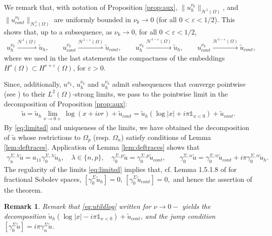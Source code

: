 \documentclass[report]{elsarticle}
\newtheorem{remark}[theorem]{Remark}
\numberwithin{theorem}{section}
\newcommand{\re}{\varepsilon}
\begin{document}
We remark that, with notation of Proposition \ref{prop:aux}, $\|u^{\nu_k}_h\|_{\mathcal{H}^1(\Omega)}$, and $\|u^{\nu_k}_{cont}\|_{\mathcal{H}^1_{\re}(\Omega)}$ are uniformly bounded in $\nu_k\rightarrow 0$ (for all $0<\re<1/2$). This shows that, up to a subsequence, as $\nu_k\rightarrow 0$, for all $0<\re<1/2$, 
\begin{align}
	\label{eq:limitsd}
	u^{\nu_k}_h\overset{\mathcal{H}^{1}(\Omega)}{\rightharpoonup} \widetilde{u}_h, \qquad u^{\nu_k}_{cont}\overset{\mathcal{H}^{1-\re}(\Omega)}{\rightharpoonup}\widetilde{u}_{cont},\qquad u^{\nu_k}_h\overset{\mathcal{H}^{1-\re}(\Omega)}{\rightarrow} \widetilde{u}_h, \qquad u^{\nu_k}_{cont}\overset{\mathcal{H}^{1-\re}(\Omega)}{\rightarrow}\widetilde{u}_{cont},
\end{align}
where we used in the last statements the compactness of the embeddings $H^s(\Omega)\subset H^{s+\re}(\Omega)$, for $\re>0$. 

Since, additionally, $u^{\nu_k}$, $u^{\nu_k}_h$ and $u_h^{\nu_k}$ admit subsequences that converge pointwise (see \cite[Theorem 4.9]{brezis2010functional}) to their $L^2(\Omega)$-strong limits, we pass to the pointwise limit in the decomposition of Proposition \ref{prop:aux}: 
\begin{align}
	\label{eq:utildlog}
	\widetilde{u}=\widetilde{u}_h\lim\limits_{\nu\rightarrow 0+}\log(x+i\nu r)+\widetilde{u}_{cont}=\widetilde{u}_h(\log|x|+i\pi\mathbb{1}_{x<0})+\widetilde{u}_{cont}.
\end{align}
By \eqref{eq:limitsd} and uniqueness of the limits, we have obtained the decomposition of $\widetilde{u}$ whose restrictions to $\Omega_p$ (resp. $\Omega_n$) satisfy conditions of Lemma \ref{lem:deftraces}. Application of Lemma \ref{lem:deftraces} shows that 
\begin{align*}
	\gamma_n^{\Sigma,\lambda}\widetilde{u}=a_{11}\gamma_0^{\Sigma,\lambda}\widetilde{u}_h,\quad\lambda\in\{n,p\},\quad \gamma_0^{\Sigma,p}\widetilde{u}=\gamma_0^{\Sigma,p}\widetilde{u}_{cont}, \qquad \gamma_0^{\Sigma,n}\widetilde{u}=\gamma_{0}^{\Sigma,n}\widetilde{u}_{cont}+i\pi \gamma_0^{\Sigma,n}\widetilde{u}_h.
\end{align*}
The regularity of the limits \eqref{eq:limitsd} implies that, cf. Lemma 1.5.1.8 of \cite{grisvard_book} for fractional Sobolev spaces,  
$
[\gamma_0^{\Sigma}\widetilde{u}_h]=0, \, [\gamma_0^{\Sigma}\widetilde{u}_{cont}]=0, 
$
and hence the assertion of the theorem. 
\begin{remark}
	\label{rem:lap_wrong_sign}
	Remark that \eqref{eq:utildlog} written for $\nu\rightarrow 0-$ yields the decomposition $\widetilde{u}_h(\log|x|-i\pi\mathbb{1}_{x<0})+\widetilde{u}_{cont}$, and the jump condition  $[\gamma_0^{\Sigma}\tilde{u}]=i\pi \gamma_n^{\Sigma}\tilde{u}$. 
\end{remark}
\end{document}
